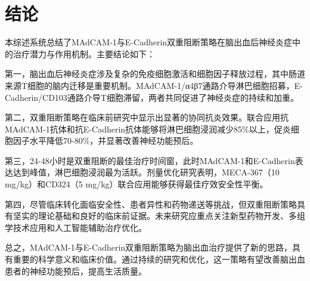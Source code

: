 \documentclass[12pt,a4paper]{article}
\begin{document}
\section{结论}
本综述系统总结了MAdCAM-1与E-Cadherin双重阻断策略在脑出血后神经炎症中的治疗潜力与作用机制。主要结论如下：

第一，脑出血后神经炎症涉及复杂的免疫细胞激活和细胞因子释放过程，其中肠道来源T细胞的脑内迁移是重要机制。MAdCAM-1/α4β7通路介导淋巴细胞招募，E-Cadherin/CD103通路介导T细胞滞留，两者共同促进了神经炎症的持续和加重。

第二，双重阻断策略在临床前研究中显示出显著的协同抗炎效果。联合应用抗MAdCAM-1抗体和抗E-Cadherin抗体能够将淋巴细胞浸润减少85\%以上，促炎细胞因子水平降低70-80\%，并显著改善神经功能预后。

第三，24-48小时是双重阻断的最佳治疗时间窗，此时MAdCAM-1和E-Cadherin表达达到峰值，淋巴细胞浸润最为活跃。剂量优化研究表明，MECA-367（10 mg/kg）和CD324（5 mg/kg）联合应用能够获得最佳疗效安全性平衡。

第四，尽管临床转化面临安全性、患者异性和药物递送等挑战，但双重阻断策略具有坚实的理论基础和良好的临床前证据。未来研究应重点关注新型药物开发、多组学技术应用和人工智能辅助治疗优化。

总之，MAdCAM-1与E-Cadherin双重阻断策略为脑出血治疗提供了新的思路，具有重要的科学意义和临床价值。通过持续的研究和优化，这一策略有望改善脑出血患者的神经功能预后，提高生活质量。



\end{document}
